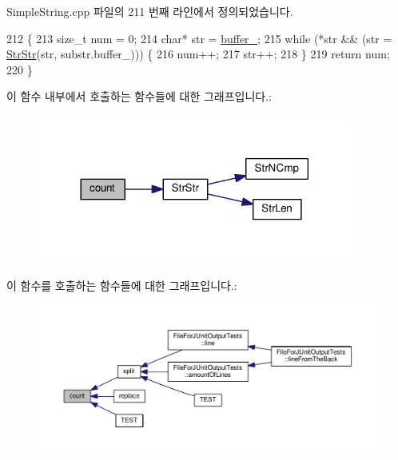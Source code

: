Simple\+String.\+cpp 파일의 211 번째 라인에서 정의되었습니다.


\begin{DoxyCode}
212 \{
213     \textcolor{keywordtype}{size\_t} num = 0;
214     \textcolor{keywordtype}{char}* str = \hyperlink{class_simple_string_a37525d5cfe40669bc9ca14b3234c70d2}{buffer\_};
215     \textcolor{keywordflow}{while} (*str && (str = \hyperlink{class_simple_string_aa4de2381337817616753c064899f257d}{StrStr}(str, substr.buffer\_))) \{
216         num++;
217         str++;
218     \}
219     \textcolor{keywordflow}{return} num;
220 \}
\end{DoxyCode}


이 함수 내부에서 호출하는 함수들에 대한 그래프입니다.\+:
\nopagebreak
\begin{figure}[H]
\begin{center}
\leavevmode
\includegraphics[width=293pt]{class_simple_string_a7b73be1ce4ddc3653ee1bc14ff1ccf3b_cgraph}
\end{center}
\end{figure}




이 함수를 호출하는 함수들에 대한 그래프입니다.\+:
\nopagebreak
\begin{figure}[H]
\begin{center}
\leavevmode
\includegraphics[width=350pt]{class_simple_string_a7b73be1ce4ddc3653ee1bc14ff1ccf3b_icgraph}
\end{center}
\end{figure}


